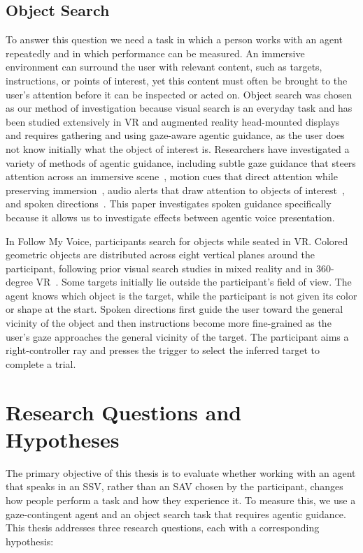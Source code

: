 \subsection{Object Search}
To answer this question we need a task in which a person works with an agent repeatedly and in which performance can be measured. An immersive environment can surround the user with relevant content, such as targets, instructions, or points of interest, yet this content must often be brought to the user's attention before it can be inspected or acted on. Object search was chosen as our method of investigation because visual search is an everyday task and has been studied extensively in VR and augmented reality head-mounted displays~\cite{gruenefeld2017eyesee360,trepkowski2019fov,chiossi2024searching,quinn2024review,kelley2025cueing} and requires gathering and using gaze-aware agentic guidance, as the user does not know initially what the object of interest is. Researchers have investigated a variety of methods of agentic guidance, including subtle gaze guidance that steers attention across an immersive scene~\cite{grogorick2017subtle}, motion cues that direct attention while preserving immersion~\cite{lange2020hivefive}, audio alerts that draw attention to objects of interest~\cite{sabouni2025guidance}, and spoken directions~\cite{tanaka2026coarse}. This paper investigates spoken guidance specifically because it allows us to investigate effects between agentic voice presentation.

In Follow My Voice, participants search for objects while seated in VR. Colored geometric objects are distributed across eight vertical planes around the participant, following prior visual search studies in mixed reality and in 360-degree VR~\cite{chiossi2024searching,kelley2025cueing}. Some targets initially lie outside the participant's field of view. The agent knows which object is the target, while the participant is not given its color or shape at the start. Spoken directions first guide the user toward the general vicinity of the object and then instructions become more fine-grained as the user's gaze approaches the general vicinity of the target. The participant aims a right-controller ray and presses the trigger to select the inferred target to complete a trial.

\section{Research Questions and Hypotheses}
\label{sec:research-questions}
The primary objective of this thesis is to evaluate whether working with an agent that speaks in an SSV, rather than an SAV chosen by the participant, changes how people perform a task and how they experience it. To measure this, we use a gaze-contingent agent and an object search task that requires agentic guidance. This thesis addresses three research questions, each with a corresponding hypothesis:

